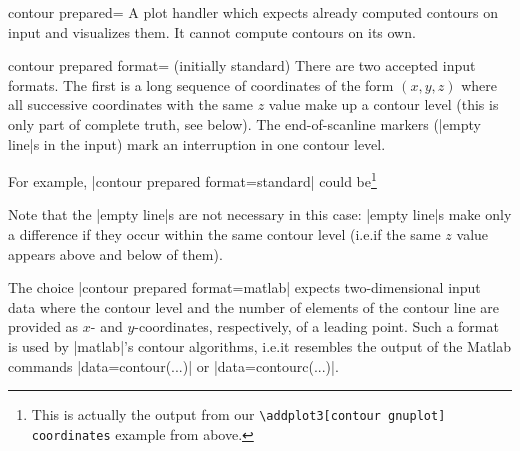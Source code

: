 {{\begin{plottype}[/pgfplots]{contour prepared=\textcolor{black}{}}
    A plot handler which expects already computed contours on input and
    visualizes them. It cannot compute contours on its own.

    \begin{pgfplotskey}{contour prepared format= (initially standard)}
        There are two accepted input formats. The first is a long sequence of
        coordinates of the form $(x,y,z)$ where all successive coordinates with
        the same $z$ value make up a contour level (this is only part of
        complete truth, see below). The end-of-scanline markers (|empty line|s
        in the input) mark an interruption in one contour level.

        For example, |contour prepared format=standard| could be\footnote{This
        is actually the output from our \texttt{\textbackslash addplot3[contour
        gnuplot] coordinates} example from above.}
\begin{codeexample}[]
\end{codeexample}
        \noindent Note that the |empty line|s are not necessary in this case:
        |empty line|s make only a difference if they occur within the same
        contour level (i.e.\@ if the same $z$ value appears above and below of
        them).

        The choice |contour prepared format=matlab| expects two-dimensional
        input data where the contour level and the number of elements of the
        contour line are provided as $x$- and $y$-coordinates, respectively, of
        a leading point. Such a format is used by |matlab|'s contour
        algorithms, i.e.\@ it resembles the output of the Matlab commands
        |data=contour(...)| or |data=contourc(...)|.


\end{pgfplotskey}
\end{plottype}}}
